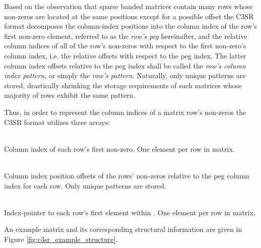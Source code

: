     Based on the observation that sparse banded matrices contain many rows whose non-zeros are located at the same
    positions except for a possible offset the C3SR format decomposes the column-index positions into the column index
    of the row's first non-zero element, referred to as the \emph{row's peg} hereinafter, and the relative column
    indices of all of the row's non-zeros with respect to the first non-zero's column index, i.e. the relative offsets
    with respect to the peg index. The latter column index offsets relative to the peg index shall be called the
    \emph{row's column index pattern}, or simply the \emph{row's pattern}. Naturally, only unique patterns are stored,
    drastically shrinking the storage requirements of such matrices whose majority of rows exhibit the same pattern.

    Thus, in order to represent the column indices of a matrix row's non-zeros the C3SR format utilizes three arrays:

    \begin{description}[align = left, labelwidth = 4cm]
      \item [JP - \emph{Peg column indices}] \hfill \\
        Column index of each row's first non-zero. One element per row in matrix.
      \item [J - \emph{Column index patterns}] \hfill \\
        Column index position offsets of the rows' non-zeros relative to the peg column index for each row. Only unique patterns are stored.
      \item [JS - \emph{Patterns' index-pointers}] \hfill \\
        Index-pointer to each row's first element within \J. One element per row in matrix.
    \end{description}

    An example matrix and its corresponding structural information are given in Figure \ref{fig:c3sr_example_structure}.

